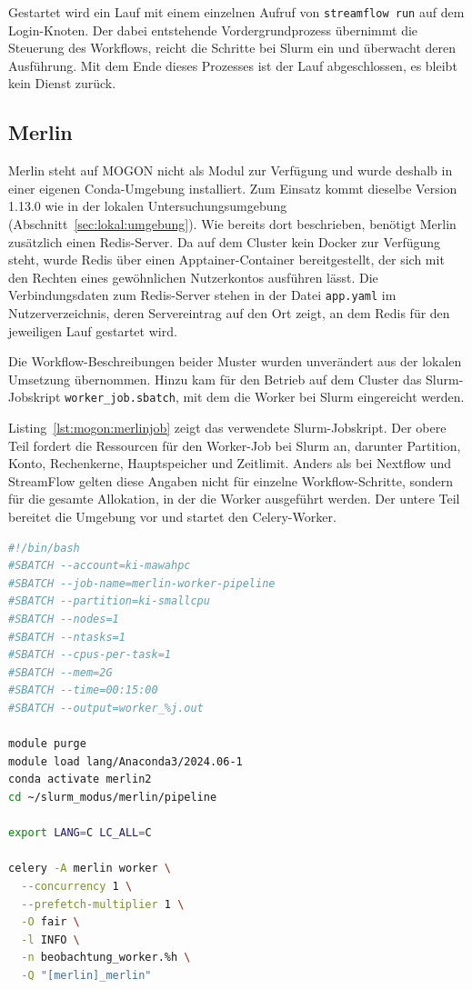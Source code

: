 Gestartet wird ein Lauf mit einem einzelnen Aufruf von
\texttt{streamflow run} auf dem Login-Knoten. Der dabei entstehende
Vordergrundprozess übernimmt die Steuerung des Workflows, reicht die
Schritte bei Slurm ein und überwacht deren Ausführung. Mit dem Ende
dieses Prozesses ist der Lauf abgeschlossen, es bleibt kein Dienst
zurück.

\subsection{Merlin}
\label{sec:mogon:merlin}

Merlin steht auf MOGON nicht als Modul zur Verfügung und wurde
deshalb in einer eigenen Conda-Umgebung installiert. Zum Einsatz
kommt dieselbe Version 1.13.0 wie in der lokalen
Untersuchungsumgebung (Abschnitt~\ref{sec:lokal:umgebung}). Wie
bereits dort beschrieben, benötigt Merlin zusätzlich einen
Redis-Server. Da auf dem Cluster kein Docker zur Verfügung steht,
wurde Redis über einen Apptainer-Container bereitgestellt, der sich
mit den Rechten eines gewöhnlichen Nutzerkontos ausführen lässt.
Die Verbindungsdaten zum Redis-Server stehen in der Datei
\texttt{app.yaml} im Nutzerverzeichnis, deren Servereintrag auf den
Ort zeigt, an dem Redis für den jeweiligen Lauf gestartet wird.

Die Workflow-Beschreibungen beider Muster wurden unverändert aus der
lokalen Umsetzung übernommen. Hinzu kam für den Betrieb auf dem
Cluster das Slurm-Jobskript \texttt{worker\_job.sbatch}, mit dem die
Worker bei Slurm eingereicht werden.

Listing~\ref{lst:mogon:merlinjob} zeigt das verwendete
Slurm-Jobskript. Der obere Teil fordert die Ressourcen für den
Worker-Job bei Slurm an, darunter Partition, Konto,
Rechenkerne, Hauptspeicher und Zeitlimit. Anders als bei Nextflow
und StreamFlow gelten diese Angaben nicht für einzelne
Workflow-Schritte, sondern für die gesamte Allokation, in der die
Worker ausgeführt werden. Der untere Teil bereitet die Umgebung vor
und startet den Celery-Worker.

\begin{lstlisting}[language=bash,
  caption={Jobskript zum Start der Merlin-Worker auf MOGON},
  label={lst:mogon:merlinjob}]
#!/bin/bash
#SBATCH --account=ki-mawahpc
#SBATCH --job-name=merlin-worker-pipeline
#SBATCH --partition=ki-smallcpu
#SBATCH --nodes=1
#SBATCH --ntasks=1
#SBATCH --cpus-per-task=1
#SBATCH --mem=2G
#SBATCH --time=00:15:00
#SBATCH --output=worker_%j.out

module purge
module load lang/Anaconda3/2024.06-1
conda activate merlin2
cd ~/slurm_modus/merlin/pipeline

export LANG=C LC_ALL=C

celery -A merlin worker \
  --concurrency 1 \
  --prefetch-multiplier 1 \
  -O fair \
  -l INFO \
  -n beobachtung_worker.%h \
  -Q "[merlin]_merlin"
\end{lstlisting}

